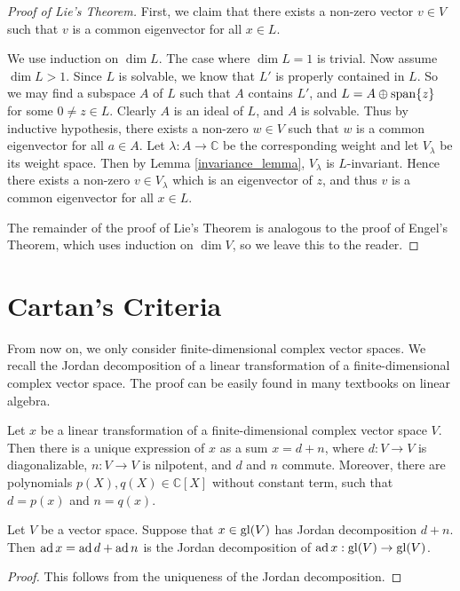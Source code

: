 \begin{proof}[Proof of Lie's Theorem]
    First, we claim that there exists a non-zero vector $v\in V$ such that $v$ is a common eigenvector for all $x\in L$. 

    We use induction on $\dim L$. The case where $\dim L=1$ is trivial. Now assume $\dim L>1$. Since $L$ is solvable, we know that $L'$ is properly contained in $L$. So we may find a subspace $A$ of $L$ such that $A$ contains $L'$, and $L=A\oplus \operatorname{span}\{z\}$ for some $0\neq z\in L$. Clearly $A$ is an ideal of $L$, and $A$ is solvable. Thus by inductive hypothesis, there exists a non-zero $w\in V$ such that $w$ is a common eigenvector for all $a\in A$. Let $\lambda:A\to\mathbb{C}$ be the corresponding weight and let $V_\lambda$ be its weight space. Then by Lemma \ref{invariance_lemma}, $V_\lambda$ is $L$-invariant. Hence there exists a non-zero $v\in V_\lambda$ which is an eigenvector of $z$, and thus $v$ is a common eigenvector for all $x\in L$.

    The remainder of the proof of Lie's Theorem is analogous to the proof of Engel's Theorem, which uses induction on $\dim V$, so we leave this to the reader.
\end{proof}

\section{Cartan's Criteria}

From now on, we only consider finite-dimensional complex vector spaces. We recall the Jordan decomposition of a linear transformation of a finite-dimensional complex vector space. The proof can be easily found in many textbooks on linear algebra.
\begin{lem}
    Let $x$ be a linear transformation of a finite-dimensional complex vector space $V$. Then there is a unique expression of $x$ as a sum $x=d+n$, where $d:V\to V$ is diagonalizable, $n:V\to V$ is nilpotent, and $d$ and $n$ commute. Moreover, there are polynomials $p(X),q(X)\in\mathbb{C}[X]$ without constant term, such that $d=p(x)$ and $n=q(x)$.
\end{lem}

\begin{cor}
    Let $V$ be a vector space. Suppose that $x\in\mathrm{gl}(V)$ has Jordan decomposition $d+n$. Then $\operatorname{ad} x=\operatorname{ad} d+\operatorname{ad} n$ is the Jordan decomposition of $\operatorname{ad} x:\mathrm{gl}(V) \to \mathrm{gl}(V)$.
\end{cor}

\begin{proof}
    This follows from the uniqueness of the Jordan decomposition.
\end{proof}

